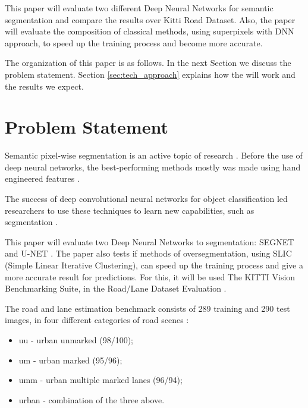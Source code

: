 \documentclass[10pt,twocolumn,letterpaper]{article}
\begin{document}
This paper will evaluate two different Deep Neural Networks for semantic segmentation and compare the results over Kitti Road Dataset. Also, the paper will evaluate the composition of classical methods, using superpixels with DNN approach, to speed up the training process and become more accurate.

The organization of this paper is as follows. In the next Section we discuss the problem statement. Section \ref{sec:tech_approach} explains how the will work and the results we expect.

\section{Problem Statement} \label{sec:prob_statement}


Semantic pixel-wise segmentation is an active topic of research \cite{SEGNET}. Before the use of deep neural networks, the best-performing methods mostly was made using hand engineered features \cite{SEGNET}.

The success of deep convolutional neural networks for object classification led researchers to use these techniques to learn new capabilities, such as segmentation \cite{SEGNET}. 

This paper will evaluate two Deep Neural Networks to segmentation: SEGNET \cite{SEGNET} and U-NET \cite{UNET}. The paper also tests if methods of oversegmentation, using SLIC (Simple Linear Iterative Clustering), can speed up the training process and give a more accurate result for predictions. For this, it will be used The KITTI Vision Benchmarking Suite, in the Road/Lane Dataset Evaluation \cite{KITTI}.

The road and lane estimation benchmark consists of 289 training and 290 test images, in four different categories of road scenes \cite{KITTI}:

\begin{itemize}
 \item uu - urban unmarked (98/100);
 \item um - urban marked (95/96);
 \item umm - urban multiple marked lanes (96/94);
 \item urban - combination of the three above.
\end{itemize}
\end{document}
